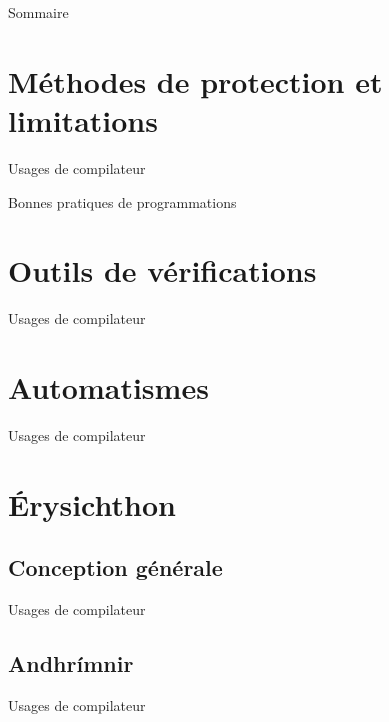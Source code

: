 \documentclass{backend/backend}
\begin{document}
\begin{frame}{Sommaire}

        \small
        \tableofcontents

\end{frame}



\section{Méthodes de protection et limitations}

\begin{frame}{Usages de compilateur}
    
\end{frame}

\begin{frame}{Bonnes pratiques de programmations}
    
\end{frame}

\section{Outils de vérifications}
\begin{frame}{Usages de compilateur}
    
\end{frame}
\section{Automatismes}
\begin{frame}{Usages de compilateur}
    
\end{frame}
\section{Érysichthon}

\subsection{Conception générale}
\begin{frame}{Usages de compilateur}
    
\end{frame}
\subsection{Andhrímnir}
\begin{frame}{Usages de compilateur}
    
\end{frame}
\end{document}
